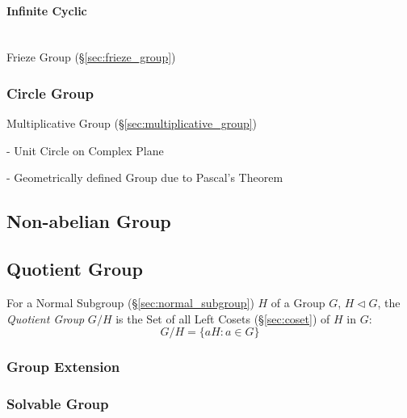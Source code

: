 \paragraph{Infinite Cyclic}\label{sec:infinite_cyclic}
\hfill \\

Frieze Group (\S\ref{sec:frieze_group})



\subsubsection{Circle Group}\label{sec:circle_group}

Multiplicative Group (\S\ref{sec:multiplicative_group})

- Unit Circle on Complex Plane

- Geometrically defined Group due to Pascal's Theorem
  \cite{lemmermeyer-shirali09}



\subsection{Non-abelian Group}\label{sec:nonabelian_group}

\subsection{Quotient Group}\label{sec:quotient_group}

For a Normal Subgroup (\S\ref{sec:normal_subgroup}) $H$ of a Group
$G$, $H \triangleleft G$, the \emph{Quotient Group} $G/H$ is the Set
of all Left Cosets (\S\ref{sec:coset}) of $H$ in $G$:
\[
    G/H = \{ aH : a \in G \}
\]



\subsubsection{Group Extension}\label{sec:group_extension}

\subsubsection{Solvable Group}\label{sec:solvable_group}



